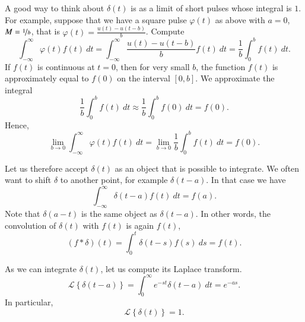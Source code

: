 A good way to think about $\delta(t)$ is as a limit of short pulses
whose integral is $1$.  For example, suppose that
we have a square pulse $\varphi(t)$ as above with $a=0$,
$M=\nicefrac{1}{b}$, that is $\varphi(t) = \frac{u(t) - u(t-b)}{b}$.
Compute
\begin{equation*}
\int_{-\infty}^\infty \varphi(t) f(t) ~dt =
\int_{-\infty}^\infty \frac{u(t) - u(t-b)}{b} f(t) ~dt =
\frac{1}{b} \int_{0}^b f(t) ~dt .
\end{equation*}
If $f(t)$ is continuous at $t=0$, then
for very small $b$, the function $f(t)$ is approximately equal to $f(0)$ on
the interval $[0,b]$.  We approximate the integral
\begin{equation*}
\frac{1}{b} \int_{0}^b f(t) ~dt \approx
\frac{1}{b} \int_{0}^b f(0) ~dt = f(0) .
\end{equation*}
Hence,
\begin{equation*}
\lim_{b\to 0}
\int_{-\infty}^\infty \varphi(t) f(t) ~dt =
\lim_{b\to 0}
\frac{1}{b} \int_{0}^b f(t) ~dt  = f(0) .
\end{equation*}

Let us therefore accept $\delta(t)$ as an object that is possible to
integrate.  We often want to shift $\delta$ to another point, for example
$\delta(t-a)$.  In that case we have
\begin{equation*}
\int_{-\infty}^\infty \delta(t-a) f(t) ~dt = f(a) .
\end{equation*}
Note that $\delta(a-t)$ is the same object as $\delta(t-a)$.
In other words, the convolution of $\delta(t)$ with $f(t)$ is again $f(t)$,
\begin{equation*}
(f * \delta) (t) = 
\int_{0}^t \delta(t-s) f(s) ~ds
= f(t) .
\end{equation*}

As we can integrate $\delta(t)$, let us compute its Laplace transform.
\begin{equation*}
\boxed{~~
{\mathcal{L}} \left\{ \delta(t-a) \right\}
=
\int_{0}^\infty e^{-st} \delta(t-a) ~dt = e^{-as} .
~~}
\end{equation*}
In particular,
\begin{equation*}
{\mathcal{L}} \left\{ \delta(t) \right\} = 1 .
\end{equation*}

